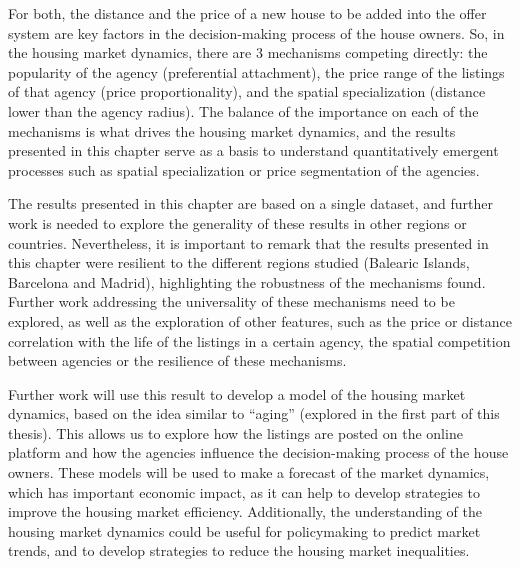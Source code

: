 For both, the distance and the price of a new house to be added into the offer system are key factors in the decision-making process of the house owners. So, in the housing market dynamics, there are 3 mechanisms competing directly: the popularity of the agency (preferential attachment), the price range of the listings of that agency (price proportionality), and the spatial specialization (distance lower than the agency radius). The balance of the importance on each of the mechanisms is what drives the housing market dynamics, and the results presented in this chapter serve as a basis to understand quantitatively emergent processes such as spatial specialization or price segmentation of the agencies.

The results presented in this chapter are based on a single dataset, and further work is needed to explore the generality of these results in other regions or countries. Nevertheless, it is important to remark that the results presented in this chapter were resilient to the different regions studied (Balearic Islands, Barcelona and Madrid), highlighting the robustness of the mechanisms found. Further work addressing the universality of these mechanisms need to be explored, as well as the exploration of other features, such as the price or distance correlation with the life of the listings in a certain agency, the spatial competition between agencies or the resilience of these mechanisms.

Further work will use this result to develop a model of the housing market dynamics, based on the idea similar to ``aging'' (explored in the first part of this thesis). This allows us to explore how the listings are posted on the online platform and how the agencies influence the decision-making process of the house owners. These models will be used to make a forecast of the market dynamics, which has important economic impact, as it can help to develop strategies to improve the housing market efficiency. Additionally, the understanding of the housing market dynamics could be useful for policymaking to predict market trends, and to develop strategies to reduce the housing market inequalities.